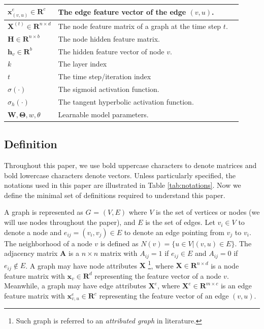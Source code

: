 \begin{table}[t]
\begin{tabular} {  l l p{7cm} }
				$\mathbf{x}^e_{(v,u)} \in \mathbf{R}^{c}$ & The edge feature vector of the edge $(v,u)$. \\ \hline
				$\mathbf{X}^{(t)} \in \mathbf{R}^{n\times d}$ & The node feature matrix of a graph at the time step $t$. \\ \hline
				$\mathbf{H} \in \mathbf{R}^{n \times b}$ & The node hidden feature matrix. \\ \hline
				$\mathbf{h}_v \in \mathbf{R}^{b}$ & The hidden feature vector of node $v$. \\ \hline
				$k$ & The layer index \\ \hline
				$t$ & The time step/iteration index  \\ \hline
				$\sigma(\cdot)$ & The sigmoid activation function. \\ \hline
				$\sigma_h(\cdot)$ & The tangent hyperbolic activation function. \\ \hline	$\mathbf{W},\mathbf{\Theta},w,\theta$ & Learnable model parameters. \\  
				\bottomrule
		\end{tabular}
	\end{table}
	
	
	\subsection{Definition}

	Throughout this paper, we use bold uppercase characters to denote matrices and  bold lowercase characters denote vectors. Unless particularly specified, the notations used in this paper are illustrated in Table \ref{tab:notations}. Now we define the minimal set of definitions required to understand this paper. 
	
	\begin{definition}[Graph]
		A graph is represented as $G$ = $(V,E)$ where $V$ is the set of vertices or nodes (we will use nodes throughout the paper), and $E$ is the set of edges. Let $v_i \in V$ to denote a node and $e_{ij}=(v_i,v_j) \in E$ to denote an edge pointing from $v_j$ to $v_i$. The neighborhood of a node $v$ is defined as $N(v)= \{u\in V|(v,u)\in E\}$.
		The adjacency matrix $\mathbf{A}$ is a $n\times n$ matrix with $A_{ij} = 1$ if $e_{ij} \in E$ and $A_{ij} = 0$ if $e_{ij} \notin E$. A graph may have node attributes $\mathbf{X}$ \footnote{Such graph is referred to an \textit{attributed graph} in literature.}, where $\mathbf{X} \in \mathbf{R}^{n\times d}$ is a node feature matrix with $\mathbf{x}_v \in \mathbf{R}^d$ representing the feature vector of a node $v$.   Meanwhile, a graph may have edge attributes $\mathbf{X}^e$, where $\mathbf{X}^e \in \mathbf{R}^{m\times c}$ is an edge feature matrix with $\mathbf{x}^e_{v,u} \in \mathbf{R}^c$ representing the feature vector of an edge $(v,u)$.
	
	\end{definition}

